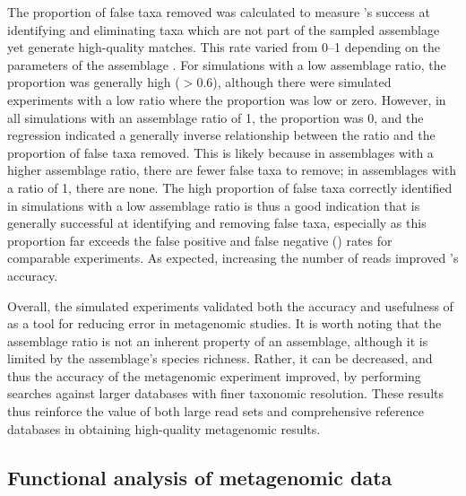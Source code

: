 The proportion of false taxa removed was calculated to measure 's success at identifying and eliminating taxa which are not part of the sampled assemblage yet generate high-quality  matches.
This rate varied from 0--1 depending on the parameters of the assemblage .
For simulations with a low assemblage ratio, the proportion was generally high ($> 0.6$), although there were simulated experiments with a low ratio where the proportion was low or zero.
However, in all simulations with an assemblage ratio of 1, the proportion was 0, and the regression indicated a generally inverse relationship between the ratio and the proportion of false taxa removed.
This is likely because in assemblages with a higher assemblage ratio, there are fewer false taxa to remove; in assemblages with a ratio of 1, there are none.
The high proportion of false taxa correctly identified in simulations with a low assemblage ratio is thus a good indication that  is generally successful at identifying and removing false taxa, especially as this proportion far exceeds the false positive and false negative () rates for comparable experiments.
As expected, increasing the number of reads improved 's accuracy.

Overall, the simulated experiments validated both the accuracy and usefulness of  as a tool for reducing error in metagenomic studies.
It is worth noting that the assemblage ratio is not an inherent property of an assemblage, although it is limited by the assemblage's species richness.
Rather, it can be decreased, and thus the accuracy of the metagenomic experiment improved, by performing  searches against larger databases with finer taxonomic resolution.
These results thus reinforce the value of both large read sets and comprehensive reference databases in obtaining high-quality metagenomic results.

\subsection{Functional analysis of metagenomic data}

